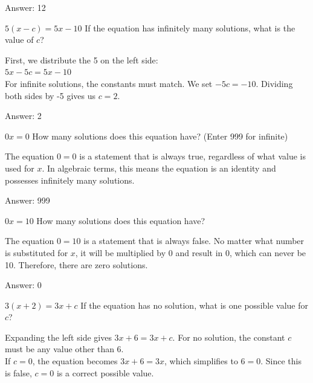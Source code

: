 \documentclass[11pt,paper=a4,answers]{exam}
\begin{document}
\begin{questions}
\begin{solution}
\vspace{20pt}
Answer: \colorbox{yellow!100}{12}
\end{solution}

\question
$5(x - c) = 5x - 10$
If the equation has infinitely many solutions, what is the value of $c$?

\begin{solution}
First, we distribute the 5 on the left side:
\\[10pt]
$5x - 5c = 5x - 10$
\\[10pt]
For infinite solutions, the constants must match. We set $-5c = -10$. Dividing both sides by -5 gives us $c = 2$.

\vspace{20pt}
Answer: \colorbox{yellow!100}{2}
\end{solution}

\question
$0x = 0$
How many solutions does this equation have? (Enter 999 for infinite)

\begin{solution}
The equation $0 = 0$ is a statement that is always true, regardless of what value is used for $x$. In algebraic terms, this means the equation is an identity and possesses infinitely many solutions.

\vspace{20pt}
Answer: \colorbox{yellow!100}{999}
\end{solution}

\question
$0x = 10$
How many solutions does this equation have?

\begin{solution}
The equation $0 = 10$ is a statement that is always false. No matter what number is substituted for $x$, it will be multiplied by 0 and result in 0, which can never be 10. Therefore, there are zero solutions.

\vspace{20pt}
Answer: \colorbox{yellow!100}{0}
\end{solution}

\question
$3(x + 2) = 3x + c$
If the equation has no solution, what is one possible value for $c$?

\begin{solution}
Expanding the left side gives $3x + 6 = 3x + c$. For no solution, the constant $c$ must be any value other than 6. 
\\[10pt]
If $c = 0$, the equation becomes $3x + 6 = 3x$, which simplifies to $6 = 0$. Since this is false, $c = 0$ is a correct possible value.


\end{solution}
\end{questions}
\end{document}
